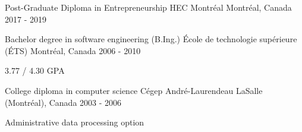 
\begin{cventries}

  \cventry
    {Post-Graduate Diploma in Entrepreneurship} %
    {HEC Montréal} %
    {Montréal, Canada} %
    {2017 - 2019} %
    {}

  \cventry
    {Bachelor degree in software engineering (B.Ing.)} %
    {École de technologie supérieure (ÉTS)} %
    {Montréal, Canada} %
    {2006 - 2010} %
    {
      \begin{cvitems} %
        \item {3.77 / 4.30 GPA}
      \end{cvitems}
    }

  \cventry
    {College diploma in computer science} %
    {Cégep André-Laurendeau} %
    {LaSalle (Montréal), Canada} %
    {2003 - 2006} %
    {
      \begin{cvitems} %
        \item {Administrative data processing option}
      \end{cvitems}
    }

\end{cventries}